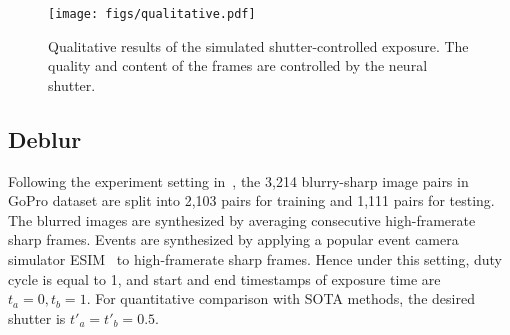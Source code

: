 \documentclass[10pt,twocolumn,letterpaper]{article}
\begin{document}
\begin{figure*}[t!]
\centering
	\texttt{[image: figs/qualitative.pdf]}
	\caption{
		Qualitative results of the simulated shutter-controlled exposure.
		The quality and content of the frames are controlled by the neural shutter.
}
	\label{fig:qualitative_results}
\end{figure*}

\subsection{Deblur}
Following the experiment setting in~\cite{EDI, EFNet}, the 3,214 blurry-sharp image pairs in GoPro dataset are split into 2,103 pairs for training and 1,111 pairs for testing. 
The blurred images are synthesized by averaging  consecutive high-framerate sharp frames.
Events are synthesized by applying a popular event camera simulator ESIM~\cite{ESIM-Simulator} to high-framerate sharp frames.
Hence under this setting, duty cycle is equal to 1, and start and end timestamps of exposure time are $t_a=0, t_b=1$. For quantitative comparison with SOTA methods, the desired shutter is $t'_a=t'_b=0.5$.
\end{document}
